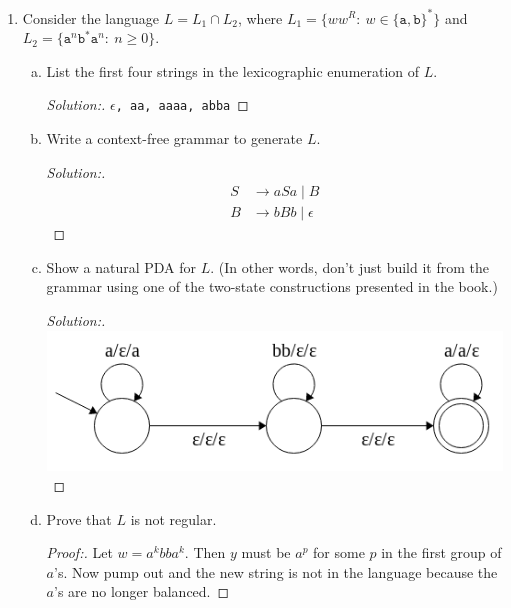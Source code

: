 \documentclass[10pt]{article}
\begin{document}
\begin{enumerate}[1)]
\begin{enumerate}[a)]
\item
Prove that $L$ is not regular.
\begin{proof}[Proof:]
If $L$ were regular, then $L^R$ would be regular.  If $L^R$ were regular, then $(L^R)^c$ would be regular.  If $(L^R)^c$ were regular, then $L' = (L^R)^c$ \cap $a^*ba^*b$ would be regular. $L' = a^nba^nb$.
Let $w = a^{2k}ba^{4k}b$.
\end{proof}
\end{enumerate}


\item
Consider the language $L = L_1 \cap L_2$, where $L_1 = \{ww^R:\ w \in \{\texttt{a}, \texttt{b}\}^*\}$ and $L_2 = \{\texttt{a}^n\texttt{b}^*\texttt{a}^n:\ n \geq 0\}$.
\begin{enumerate}[a)]
\item
List the first four strings in the lexicographic enumeration of $L$.
\begin{proof}[Solution:]
\texttt{$\epsilon$, aa, aaaa, abba}
\end{proof}

\item
Write a context-free grammar to generate $L$.
\begin{proof}[Solution:]
\begin{align*}
S &\rightarrow aSa \mid B\\
B &\rightarrow bBb \mid \epsilon
\end{align*}
\end{proof}

\item
Show a natural PDA for $L$.  (In other words, don’t just build it from the grammar using one of the two-state constructions presented in the book.)
\begin{proof}[Solution:]$ $\\
\includegraphics[scale=.5]{images/solutions/3c.png}
\end{proof}

\item
Prove that $L$ is not regular.
\begin{proof}[Proof:]
Let $w = a^kbba^k$.  Then $y$ must be $a^p$ for some $p$ in the first group of $a$'s.  Now pump out and the new string is not in the language because the $a$'s are no longer balanced.
\end{proof}
\end{enumerate}



\end{enumerate}
\end{document}
